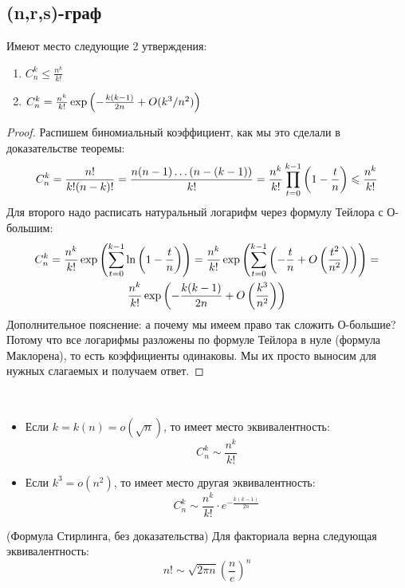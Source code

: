 \subsection{(n,r,s)-граф}

\begin{lemma}
	Имеют место следующие 2 утверждения:
	\begin{enumerate}
		\item \(C_n^k \le \frac{n^k}{k!}\)
		
		\item \(C_n^k = \frac{n^k}{k!} \exp \left(-\frac{k(k - 1)}{2n} + O(k^3 / n^2)\right)\)
	\end{enumerate}
\end{lemma}

\begin{proof}
	Распишем биномиальный коэффициент, как мы это сделали в доказательстве теоремы:
	\[
		C_n^k = \frac{n!}{k! (n - k)!} = \frac{n(n - 1) \ldots (n - (k - 1))}{k!} = \frac{n^k}{k!} \prod_{t = 0}^{k - 1} \left(1 - \frac{t}{n}\right) \leqslant \frac{n^k}{k!}
	\]
	Для второго надо расписать натуральный логарифм через формулу Тейлора с О-большим:
	\begin{multline*}
		C_n^k = \frac{n^k}{k!} \exp\left(\sum_{t = 0}^{k - 1} \ln\left(1 - \frac{t}{n}\right)\right) = \frac{n^k}{k!} \exp\left(\sum_{t = 0}^{k - 1} \left(-\frac{t}{n} + O\left(\frac{t^2}{n^2}\right)\right)\right) =
		\\
		\frac{n^k}{k!} \exp\left(-\frac{k(k - 1)}{2n} + O\left(\frac{k^3}{n^2}\right)\right)
	\end{multline*}
	Дополнительное пояснение: а почему мы имеем право так сложить О-большие? Потому что все логарифмы разложены по формуле Тейлора в нуле (формула Маклорена), то есть коэффициенты одинаковы. Мы их просто выносим для нужных слагаемых и получаем ответ.
\end{proof}

\begin{corollary}~
	\begin{itemize}
		\item Если $k = k(n) = o(\sqrt{n})$, то имеет место эквивалентность:
		\[
			C_n^k \sim \frac{n^k}{k!}
		\]
		
		\item Если $k^3 = o(n^2)$, то имеет место другая эквивалентность:
		\[
			C_n^k \sim \frac{n^k}{k!} \cdot e^{-\frac{k(k - 1)}{2n}}
		\]
	\end{itemize}
\end{corollary}

\begin{theorem} (Формула Стирлинга, без доказательства)
	Для факториала верна следующая эквивалентность:
	\[
		n! \sim \sqrt{2\pi n} {(\frac{n}{e})}^n
	\]
\end{theorem}

